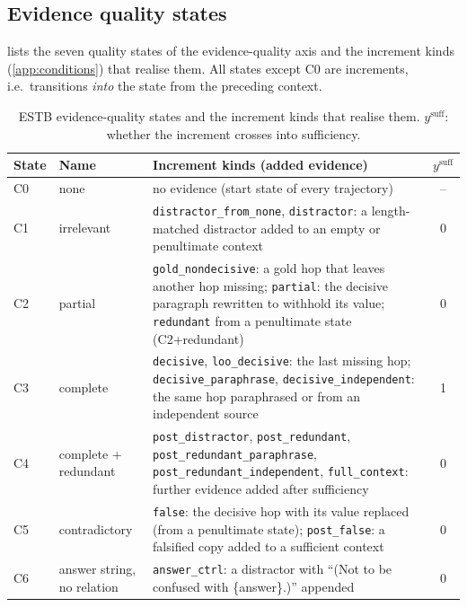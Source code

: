 \subsection{Evidence quality states}
\label{app:estb-quality}

 lists the seven quality states of the evidence-quality axis and the increment kinds (\cref{app:conditions}) that realise them. All states except C0 are increments, i.e.\ transitions \emph{into} the state from the preceding context.

\begin{table}[h]
\centering\scriptsize
\setlength{\tabcolsep}{3pt}
\begin{tabular}{llp{6.4cm}c}
\toprule
State & Name & Increment kinds (added evidence) & $y^{\mathrm{suff}}$ \\
\midrule
C0 & none & no evidence (start state of every trajectory) & -- \\
C1 & irrelevant & \texttt{distractor\_from\_none}, \texttt{distractor}: a length-matched distractor added to an empty or penultimate context & 0 \\
C2 & partial & \texttt{gold\_nondecisive}: a gold hop that leaves another hop missing; \texttt{partial}: the decisive paragraph rewritten to withhold its value; \texttt{redundant} from a penultimate state (C2+redundant) & 0 \\
C3 & complete & \texttt{decisive}, \texttt{loo\_decisive}: the last missing hop; \texttt{decisive\_paraphrase}, \texttt{decisive\_independent}: the same hop paraphrased or from an independent source & 1 \\
C4 & complete + redundant & \texttt{post\_distractor}, \texttt{post\_redundant}, \texttt{post\_redundant\_paraphrase}, \texttt{post\_redundant\_independent}, \texttt{full\_context}: further evidence added after sufficiency & 0 \\
C5 & contradictory & \texttt{false}: the decisive hop with its value replaced (from a penultimate state); \texttt{post\_false}: a falsified copy added to a sufficient context & 0 \\
C6 & answer string, no relation & \texttt{answer\_ctrl}: a distractor with ``(Not to be confused with \{answer\}.)'' appended & 0 \\
\bottomrule
\end{tabular}
\caption{ESTB evidence-quality states and the increment kinds that realise them. $y^{\mathrm{suff}}$: whether the increment crosses into sufficiency.}
\label{tab:estb-states}
\end{table}

